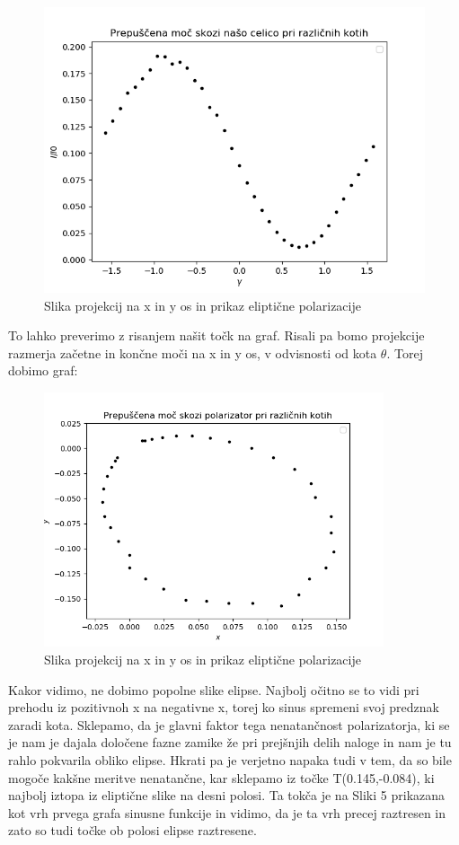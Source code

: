 \documentclass[11pt, a4paper]{article}
\theoremstyle{definition}
\theoremstyle{example}
\theoremstyle{izrek}
\begin{document}
\begin{figure}[H]
	\centering
    \includegraphics[width=12cm]{Izkoristek_kot,elipsa.png}
    \caption{Slika projekcij na x in y os in prikaz eliptične polarizacije}
\end{figure}

 To lahko preverimo z risanjem našit točk na graf. Risali pa bomo projekcije razmerja začetne in končne moči na x in y os, v odvisnosti od kota $\theta$. 
Torej dobimo graf:

\begin{figure}[H]
	\centering
    \includegraphics[width=10cm]{Elipsa.png}
    \caption{Slika projekcij na x in y os in prikaz eliptične polarizacije}
\end{figure}

Kakor vidimo, ne dobimo popolne slike elipse. Najbolj očitno se to vidi pri prehodu iz pozitivnoh x na negativne x, torej ko sinus spremeni svoj predznak zaradi kota. Sklepamo, da je glavni faktor tega nenatančnost polarizatorja, ki se je nam je dajala določene fazne zamike že pri prejšnjih delih naloge in nam je tu rahlo pokvarila obliko elipse. Hkrati pa je verjetno napaka tudi v tem, da so bile mogoče kakšne meritve nenatančne, kar sklepamo iz točke T(0.145,-0.084), ki najbolj iztopa iz eliptične slike na desni polosi. Ta tokča je na Sliki 5 prikazana kot vrh prvega grafa sinusne funkcije in vidimo, da je ta vrh precej raztresen in zato so tudi točke ob polosi elipse raztresene.  \\
\end{document}
